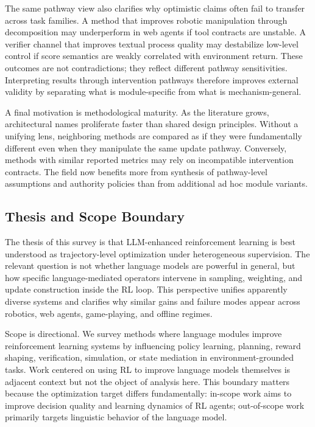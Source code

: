 ﻿\documentclass[conference]{IEEEtran}
\begin{document}
The same pathway view also clarifies why optimistic claims often fail to transfer across task families. A method that improves robotic manipulation through decomposition may underperform in web agents if tool contracts are unstable. A verifier channel that improves textual process quality may destabilize low-level control if score semantics are weakly correlated with environment return. These outcomes are not contradictions; they reflect different pathway sensitivities. Interpreting results through intervention pathways therefore improves external validity by separating what is module-specific from what is mechanism-general.

A final motivation is methodological maturity. As the literature grows, architectural names proliferate faster than shared design principles. Without a unifying lens, neighboring methods are compared as if they were fundamentally different even when they manipulate the same update pathway. Conversely, methods with similar reported metrics may rely on incompatible intervention contracts. The field now benefits more from synthesis of pathway-level assumptions and authority policies than from additional ad hoc module variants.

\subsection{Thesis and Scope Boundary}
The thesis of this survey is that LLM-enhanced reinforcement learning is best understood as trajectory-level optimization under heterogeneous supervision. The relevant question is not whether language models are powerful in general, but how specific language-mediated operators intervene in sampling, weighting, and update construction inside the RL loop. This perspective unifies apparently diverse systems and clarifies why similar gains and failure modes appear across robotics, web agents, game-playing, and offline regimes.

Scope is directional. We survey methods where language modules improve reinforcement learning systems by influencing policy learning, planning, reward shaping, verification, simulation, or state mediation in environment-grounded tasks. Work centered on using RL to improve language models themselves is adjacent context but not the object of analysis here. This boundary matters because the optimization target differs fundamentally: in-scope work aims to improve decision quality and learning dynamics of RL agents; out-of-scope work primarily targets linguistic behavior of the language model.
\end{document}
